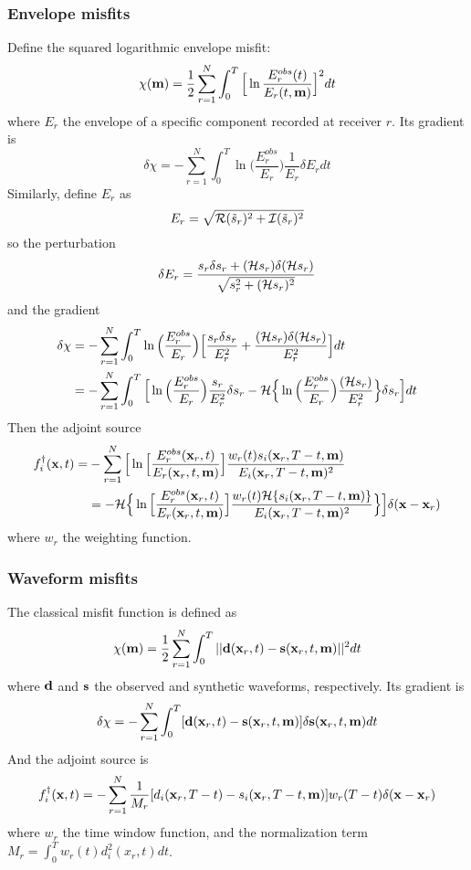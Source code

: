 \subsubsection{Envelope misfits}
Define the squared logarithmic envelope misfit:
\[ \chi(\mathbf{m})=\frac{1}{2}\sum_{r=1}^N\int_0^T\Big[\ln\frac{E_r^{obs}(t)}{E_r(t,\mathbf{m})}\Big]^2dt \]
where $E_r$ the envelope of a specific component recorded at receiver $r$.
Its gradient is
\[ \delta\chi=-\sum_{r=1}^N\int_0^T\ln\Big(\frac{E_r^{obs}}{E_r}\Big)\frac{1}{E_r}\delta E_rdt \]
Similarly, define $E_r$ as
\[ E_r=\sqrt{\mathcal{R}(\tilde s_r)^2+\mathcal{I}(\tilde s_r)^2} \]
so the perturbation
\[ \delta E_r=\frac{s_r\delta s_r+(\mathcal{H} s_r)\delta(\mathcal{H} s_r)}{\sqrt{s_r^2+(\mathcal{H} s_r)^2}} \]
and the gradient
\begin{align*}
  \delta\chi & =-\sum_{r=1}^N\int_0^T\ln\Big(\frac{E_r^{obs}}{E_r}\Big)\Big[\frac{s_r\delta s_r}{E_r^2}+\frac{(\mathcal{H} s_r)\delta(\mathcal{H} s_r)}{E_r^2}\Big]dt \\
    & =-\sum_{r=1}^N\int_0^T\Big[\ln\Big(\frac{E_r^{obs}}{E_r}\Big)\frac{s_r}{E_r^2}\delta s_r-\mathcal{H}\Big\{\ln\Big(\frac{E_r^{obs}}{E_r}\Big)\frac{(\mathcal{H} s_r)}{E_r^2}\Big\}\delta s_r\Big]dt \\
\end{align*}
Then the adjoint source
\begin{align*}
  f_i^\dagger(\mathbf{x},t)= & -\sum_{r=1}^N\Big[\ln\Big[\frac{E_r^{obs}(\mathbf{x}_r,t)}{E_r(\mathbf{x}_r,t,\mathbf{m})}\Big]\frac{w_r(t)s_i(\mathbf{x}_r,T-t,\mathbf{m})}{E_i(\mathbf{x}_r,T-t,\mathbf{m})^2} \\
    & =-\mathcal{H}\Big\{\ln\Big[\frac{E_r^{obs}(\mathbf{x}_r,t)}{E_r(\mathbf{x}_r,t,\mathbf{m})}\Big]\frac{w_r(t)\mathcal{H}\{s_i(\mathbf{x}_r,T-t,\mathbf{m})\}}{E_i(\mathbf{x}_r,T-t,\mathbf{m})^2}\Big\}\Big]\delta(\mathbf{x}-\mathbf{x}_r) \\
\end{align*}
where $w_r$ the weighting function.

\subsubsection{Waveform misfits}
The classical misfit function is defined as
\[ \chi(\mathbf{m})=\frac{1}{2}\sum_{r=1}^N\int_0^T||\mathbf{d}(\mathbf{x}_r,t)-\mathbf{s}(\mathbf{x}_r,t,\mathbf{m})||^2dt \]
where $\mathbf{d}$ and $\mathbf{s}$ the observed and synthetic waveforms, respectively.
Its gradient is
\[ \delta\chi=-\sum_{r=1}^N\int_0^T[\mathbf{d}(\mathbf{x}_r,t)-\mathbf{s}(\mathbf{x}_r,t,\mathbf{m})]\delta\mathbf{s}(\mathbf{x}_r,t,\mathbf{m})dt \]
And the adjoint source is
\[ f_i^\dagger(\mathbf{x},t)=-\sum_{r=1}^N\frac{1}{M_r}[d_i(\mathbf{x}_r,T-t)-s_i(\mathbf{x}_r,T-t,\mathbf{m})]w_r(T-t)\delta(\mathbf{x}-\mathbf{x}_r) \]
where $w_r$ the time window function,
and the normalization term $M_r=\int_0^Tw_r(t)d_i^2(x_r,t)dt$.

